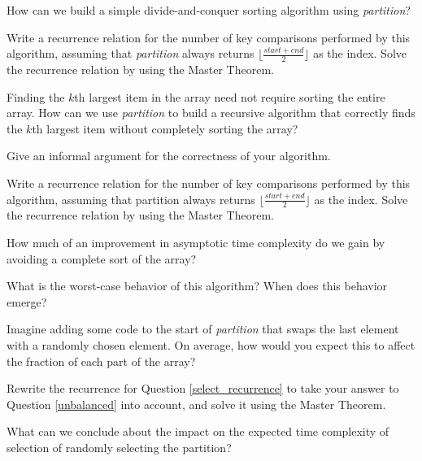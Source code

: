 \documentclass{tufte-handout}
\begin{document}
\begin{questions}
How can we build a simple divide-and-conquer sorting algorithm using \emph{partition}? 

\item Write a recurrence relation for the number of key comparisons performed by this algorithm, assuming that \emph{partition} always returns $\lfloor \frac{start + end}{2} \rfloor$ as the index. Solve the recurrence relation by using the Master Theorem. 

\item Finding the $k$th largest item in the array need not require sorting the entire array. How can we use \emph{partition} to build a recursive algorithm that correctly finds the $k$th largest item without completely sorting the array? \label{select_question}

\item Give an informal argument for the correctness of your algorithm.

\item Write a recurrence relation for the number of key comparisons performed by this algorithm, assuming that partition always returns $\lfloor \frac{start + end}{2} \rfloor$ as the index. Solve the recurrence relation by using the Master Theorem. \label{select_recurrence}

\item How much of an improvement in asymptotic time complexity do we gain by avoiding a complete sort of the array?

\item What is the worst-case behavior of this algorithm? When does this behavior emerge?

\item Imagine adding some code to the start of \emph{partition} that swaps the last element with a randomly chosen element. On average, how would you expect this to affect the fraction of each part of the array? \label{unbalanced}

\item Rewrite the recurrence for Question \ref{select_recurrence} to take your answer to Question \ref{unbalanced} into account, and solve it using the Master Theorem.

\item What can we conclude about the impact on the expected time complexity of selection of randomly selecting the partition?


\end{questions}
\end{document}
